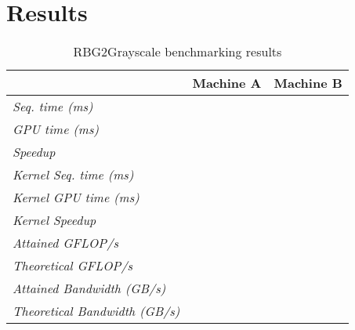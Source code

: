 \documentclass[final]{report}
\begin{document}
\section{Results}
\begin{table}[H]
	\centering
	\caption{RBG2Grayscale benchmarking results}
	\label{tab:rgb2grayscale-results}
	\begin{tabular}{lll}
	\toprule
											& \textbf{Machine A} 	& \textbf{Machine B} \\
	\midrule
	\textit{Seq. time (ms)} 				& ~ 					& ~ \\
	\textit{GPU time (ms)} 					& ~ 					& ~ \\
	\textit{Speedup} 						& ~ 					& ~ \\
	\midrule
	\textit{Kernel Seq. time (ms)} 			& ~ 					& ~ \\
	\textit{Kernel GPU time (ms)} 			& ~ 					& ~ \\
	\textit{Kernel Speedup} 				& ~ 					& ~ \\
	\midrule
	\textit{Attained GFLOP/s} 				& ~ 					& ~ \\
	\textit{Theoretical GFLOP/s} 			& ~ 					& ~ \\
	\textit{Attained Bandwidth (GB/s)}		& ~ 					& ~ \\
	\textit{Theoretical Bandwidth (GB/s)}	& ~ 					& ~ \\
	\bottomrule
	\end{tabular}
\end{table}
\end{document}
